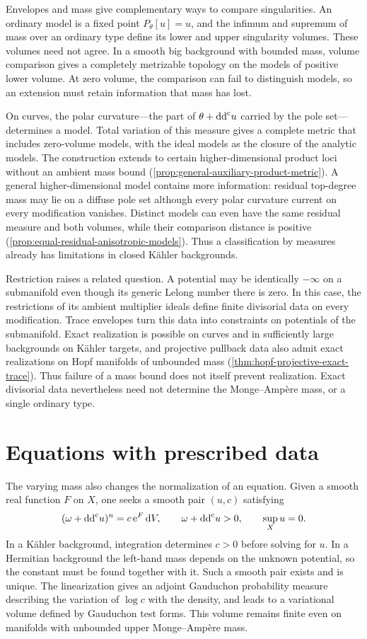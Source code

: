 Envelopes and mass give complementary ways to compare singularities. An ordinary model is a fixed point $P_\theta[u]=u$, and the infimum and supremum of mass over an ordinary type define its lower and upper singularity volumes. These volumes need not agree. In a smooth big background with bounded mass, volume comparison gives a completely metrizable topology on the models of positive lower volume. At zero volume, the comparison can fail to distinguish models, so an extension must retain information that mass has lost.

On curves, the polar curvature---the part of $\theta+\mathrm{dd}^{\mathrm{c}} u$ carried by the pole set---determines a model. Total variation of this measure gives a complete metric that includes zero-volume models, with the ideal models as the closure of the analytic models. The construction extends to certain higher-dimensional product loci without an ambient mass bound (\cref{prop:general-auxiliary-product-metric}). A general higher-dimensional model contains more information: residual top-degree mass may lie on a diffuse pole set although every polar curvature current on every modification vanishes. Distinct models can even have the same residual measure and both volumes, while their comparison distance is positive (\cref{prop:equal-residual-anisotropic-models}). Thus a classification by measures already has limitations in closed K\"ahler backgrounds.

Restriction raises a related question. A potential may be identically $-\infty$ on a submanifold even though its generic Lelong number there is zero. In this case, the restrictions of its ambient multiplier ideals define finite divisorial data on every modification. Trace envelopes turn this data into constraints on potentials of the submanifold. Exact realization is possible on curves and in sufficiently large backgrounds on K\"ahler targets, and projective pullback data also admit exact realizations on Hopf manifolds of unbounded mass (\cref{thm:hopf-projective-exact-trace}). Thus failure of a mass bound does not itself prevent realization. Exact divisorial data nevertheless need not determine the Monge--Amp\`ere mass, or a single ordinary type.

\section*{Equations with prescribed data}

The varying mass also changes the normalization of an equation. Given a smooth real function $F$ on $X$, one seeks a smooth pair $(u,c)$ satisfying
\[
 (\omega+\mathrm{dd}^{\mathrm{c}} u)^n=c\,\mathrm e^F\,\mathrm dV,
 \qquad \omega+\mathrm{dd}^{\mathrm{c}} u>0,\qquad \sup_Xu=0.
\]
In a K\"ahler background, integration determines $c>0$ before solving for $u$. In a Hermitian background the left-hand mass depends on the unknown potential, so the constant must be found together with it. Such a smooth pair exists and is unique. The linearization gives an adjoint Gauduchon probability measure describing the variation of $\log c$ with the density, and leads to a variational volume defined by Gauduchon test forms. This volume remains finite even on manifolds with unbounded upper Monge--Amp\`ere mass.


